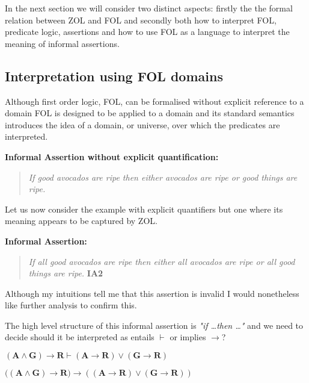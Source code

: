 In the next section we will consider two distinct aspects:  firstly the the formal relation between ZOL and FOL and secondly both how to interpret FOL, predicate logic, assertions and how to use FOL as a language to interpret the meaning of informal assertions.



\subsection{Interpretation using FOL domains}\label{sec:Domain}


Although first order logic, FOL, can be formalised without explicit reference to a domain   FOL is designed to be applied to a domain and its standard semantics   introduces the idea of a domain, or universe, over which the predicates are interpreted.
 
 { \bf Informal Assertion without explicit quantification:} 
\begin{quotation}
\emph{If  good avocados  are ripe  then either  avocados are ripe or good things are ripe.} \hspace{\fill}   
\end{quotation}
 
 Let us now   consider the example  with explicit quantifiers but one where its meaning  appears to be captured by ZOL. 
 

{ \bf Informal Assertion:} 
\begin{quotation}
\emph{If all good avocados  are ripe  then either all avocados are ripe or all good things are ripe.} \hspace{\fill}   {\bf IA2}
\end{quotation}

Although my intuitions tell me that this assertion is invalid I would nonetheless like further analysis to confirm this.

The high level structure of this informal assertion is \emph{"if \ldots then \ldots"} and we need to decide should it be interpreted as entails $\vdash$ or implies $\rightarrow$?

\hspace{\fill}   $\mathbf{(A\wedge G)   \rightarrow R} \vdash \mathbf{(A\rightarrow R)\vee (G\rightarrow R)}$\hspace{\fill}{\bf FZ1}

\hspace{\fill}   $\mathbf{((A\wedge G)   \rightarrow R}) \rightarrow \mathbf{((A\rightarrow R)\vee (G\rightarrow R))}$\hspace{\fill}{\bf FZ2}

